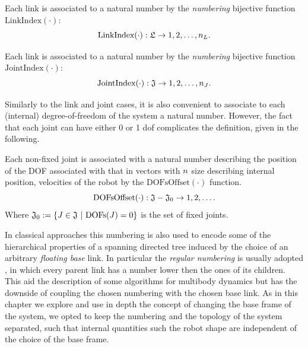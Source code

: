 \begin{definition}
\label{def:linkSerialization}
Each link is associated to a natural number by the \emph{numbering} bijective function $\text{LinkIndex}(\cdot)$:
 \begin{equation}
\text{LinkIndex}(\cdot) : \mathfrak{L} \to {1,2,\dots,n_{L}}.
 \end{equation}
\end{definition}

\begin{definition}
Each link is associated to a natural number by the \emph{numbering} bijective function $\text{JointIndex}(\cdot)$:
 \begin{equation}
\text{JointIndex}(\cdot) : \mathfrak{J} \to {1,2,\dots,n_J}.
 \end{equation}
\end{definition}

Similarly to the link and joint cases, it is also convenient to associate to each (internal) degree-of-freedom of the system a natural number. However, the fact that each joint can have either 0 or 1 dof complicates the definition, given in the following. 

\begin{definition}
Each non-fixed joint is associated with a natural number describing the position of the DOF associated with that in vectors with $n$ size describing internal position, velocities of the robot by the $\text{DOFsOffset}(\cdot)$ function.
\begin{equation}
 {\text{DOFsOffset}}(\cdot) : \mathfrak{J}-\mathfrak{J}_0 \to 1, 2, \dots .
\end{equation}
Where $\mathfrak{J}_0 := \{ J \in \mathfrak{J} \  | \  \text{DOFs}(J) = 0  \}$ is the set of fixed joints.  
\end{definition}


\begin{remark}
In classical approaches this numbering is also used to encode some of the hierarchical properties 
 of a spanning directed tree induced by the choice of an arbitrary \emph{floating base} link. In particular the \emph{regular numbering} is usually adopted \citep{featherstone2008,jain2010}, in which every parent link has a number lower then the ones of its children. This aid the description of some algorithms for multibody dynamics but has the downside of coupling the chosen numbering with the chosen base link. As in this chapter we explore and use in depth the concept of changing the base frame of the system, we opted to keep the numbering and the topology of the system separated, such that internal quantities such the robot shape are independent of the choice of the base frame.
\end{remark}

